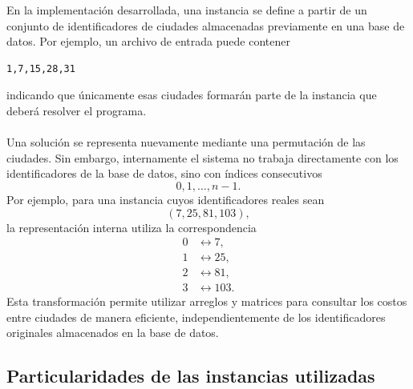 \documentclass[12pt]{article}
\begin{document}
En la implementación desarrollada, una instancia se define a partir de un
conjunto de identificadores de ciudades almacenadas previamente en una base
de datos. Por ejemplo, un archivo de entrada puede contener
\begin{verbatim}
1,7,15,28,31
\end{verbatim}
indicando que únicamente esas ciudades formarán parte de la instancia que
deberá resolver el programa.
\\\\
Una solución se representa nuevamente mediante una permutación de las
ciudades. Sin embargo, internamente el sistema no trabaja directamente con
los identificadores de la base de datos, sino con índices consecutivos
\[
    0,1,\ldots,n-1.
\]
Por ejemplo, para una instancia cuyos identificadores reales sean
\[
    (7,25,81,103),
\]
la representación interna utiliza la correspondencia
\[
\begin{aligned}
    0 &\longleftrightarrow 7,\\
    1 &\longleftrightarrow 25,\\
    2 &\longleftrightarrow 81,\\
    3 &\longleftrightarrow 103.
\end{aligned}
\]
Esta transformación permite utilizar arreglos y matrices para consultar los
costos entre ciudades de manera eficiente, independientemente de los
identificadores originales almacenados en la base de datos.

\subsection{Particularidades de las instancias utilizadas \\ }
\label{subsec:particularidades-tsp}
\end{document}
